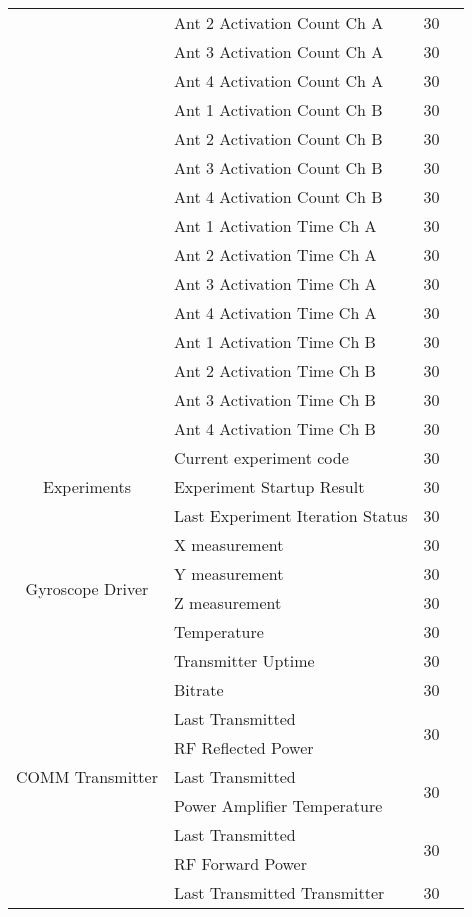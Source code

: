 \begin{longtable}{c|l|c|l}
    & Ant 2 Activation Count Ch A & 30 \\
    & Ant 3 Activation Count Ch A & 30 \\
    & Ant 4 Activation Count Ch A & 30 \\
    \cline{2-4}
    & Ant 1 Activation Count Ch B & 30 \\
    & Ant 2 Activation Count Ch B & 30 \\
    & Ant 3 Activation Count Ch B & 30 \\
    & Ant 4 Activation Count Ch B & 30 \\
    \cline{2-4}
    & Ant 1 Activation Time Ch A & 30 \\
    & Ant 2 Activation Time Ch A & 30 \\
    & Ant 3 Activation Time Ch A & 30 \\
    & Ant 4 Activation Time Ch A & 30 \\
    \cline{2-4}
    & Ant 1 Activation Time Ch B & 30 \\
    & Ant 2 Activation Time Ch B & 30 \\
    & Ant 3 Activation Time Ch B & 30 \\
    & Ant 4 Activation Time Ch B & 30 \\
    \hline
    \multirow{3}{*}{Experiments} & Current experiment code & 30 \\
    & Experiment Startup Result & 30 \\
    & Last Experiment Iteration Status & 30 \\
    \hline
    \multirow{4}{*}{Gyroscope Driver} & X measurement & 30 \\ 
    & Y measurement & 30 \\
    & Z measurement & 30 \\
    & Temperature & 30 \\
    \hline
    \multirow{15}{*}{COMM Transmitter} & Transmitter Uptime & 30 \\
    & Bitrate & 30 \\
    & Last Transmitted  & \multirow{2}{*}{30} \\
    & RF Reflected Power& \\
    & Last Transmitted  & \multirow{2}{*}{30} \\
    & Power Amplifier Temperature & \\
    & Last Transmitted  & \multirow{2}{*}{30} \\
    & RF Forward Power & \\
    & Last Transmitted Transmitter & \multirow{2}{*}{30} \\

\end{longtable}
